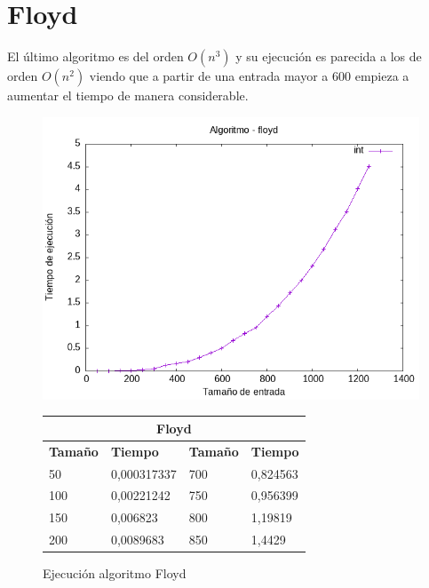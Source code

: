 \documentclass[11pt,openany]{book}
\begin{document}
\section*{Floyd}
El último algoritmo es del orden $O(n^3)$ y su ejecución es parecida a los de orden $O(n^2)$ viendo que a partir de una entrada mayor a
600 empieza a aumentar el tiempo de manera considerable.
\begin{figure}[H]
    \begin{minipage}{0.5\textwidth}
        \centering
        \includegraphics[width=\linewidth]{assets/Img/floydint.png}
        \caption{Ejecución algoritmo Floyd}
        \label{fig:floyd}
    \end{minipage}
    \begin{minipage}{0.5\textwidth}
        \centering
        \small
        \begin{tabular}{|l|l|l|l|}
            \hline
            \multicolumn{4}{|c|}{\cellcolor{blue!20}\textbf{Floyd}}               \\ \hline
            \textbf{Tamaño} & \textbf{Tiempo} & \textbf{Tamaño} & \textbf{Tiempo} \\ \hline
            50              & 0,000317337     & 700             & 0,824563        \\ \hline
            100             & 0,00221242      & 750             & 0,956399        \\ \hline
            150             & 0,006823        & 800             & 1,19819         \\ \hline
            200             & 0,0089683       & 850             & 1,4429          \\ \hline

\end{tabular}
\end{minipage}
\end{figure}
\end{document}
